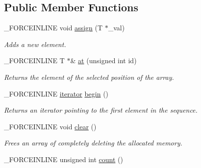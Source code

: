 \subsection*{Public Member Functions}
\begin{DoxyCompactItemize}
\item 
\hypertarget{classbt_1_1_void_vector_a8d8bc851f905c6cf71a12e31f2a7e428}{\-\_\-\-F\-O\-R\-C\-E\-I\-N\-L\-I\-N\-E void \hyperlink{classbt_1_1_void_vector_a8d8bc851f905c6cf71a12e31f2a7e428}{assign} (T $\ast$\-\_\-val)}\label{classbt_1_1_void_vector_a8d8bc851f905c6cf71a12e31f2a7e428}

\begin{DoxyCompactList}\small\item\em Adds a new element. \end{DoxyCompactList}\item 
\hypertarget{classbt_1_1_void_vector_a63fb41b46c05f8181fd0d70256e4f14c}{\-\_\-\-F\-O\-R\-C\-E\-I\-N\-L\-I\-N\-E T $\ast$\& \hyperlink{classbt_1_1_void_vector_a63fb41b46c05f8181fd0d70256e4f14c}{at} (unsigned int id)}\label{classbt_1_1_void_vector_a63fb41b46c05f8181fd0d70256e4f14c}

\begin{DoxyCompactList}\small\item\em Returns the element of the selected position of the array. \end{DoxyCompactList}\item 
\hypertarget{classbt_1_1_void_vector_a9baf8ad413dc1a7ad312de7605256d65}{\-\_\-\-F\-O\-R\-C\-E\-I\-N\-L\-I\-N\-E \hyperlink{classbt_1_1_void_vector_1_1iterator}{iterator} \hyperlink{classbt_1_1_void_vector_a9baf8ad413dc1a7ad312de7605256d65}{begin} ()}\label{classbt_1_1_void_vector_a9baf8ad413dc1a7ad312de7605256d65}

\begin{DoxyCompactList}\small\item\em Returns an iterator pointing to the first element in the sequence. \end{DoxyCompactList}\item 
\hypertarget{classbt_1_1_void_vector_a1f10a261d4af23526eb7ea76c7f01889}{\-\_\-\-F\-O\-R\-C\-E\-I\-N\-L\-I\-N\-E void \hyperlink{classbt_1_1_void_vector_a1f10a261d4af23526eb7ea76c7f01889}{clear} ()}\label{classbt_1_1_void_vector_a1f10a261d4af23526eb7ea76c7f01889}

\begin{DoxyCompactList}\small\item\em Frees an array of completely deleting the allocated memory. \end{DoxyCompactList}\item 
\hypertarget{classbt_1_1_void_vector_ac4a9d7ecfa22c679bea2b9f01de16b89}{\-\_\-\-F\-O\-R\-C\-E\-I\-N\-L\-I\-N\-E unsigned int \hyperlink{classbt_1_1_void_vector_ac4a9d7ecfa22c679bea2b9f01de16b89}{count} ()}\label{classbt_1_1_void_vector_ac4a9d7ecfa22c679bea2b9f01de16b89}


\end{DoxyCompactItemize}
